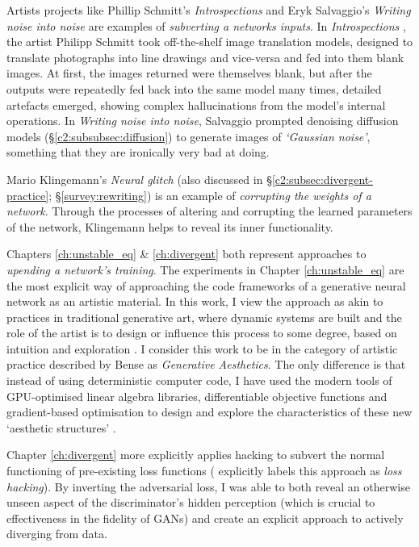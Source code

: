 Artists projects like Phillip Schmitt's \textit{Introspections} \citep{schmitt2019introspections} and Eryk Salvaggio's \textit{Writing noise into noise} \citep{salvaggio2023noise} are examples of \textit{subverting a networks inputs}. 
In \textit{Introspections} \cite{schmitt2019introspections}, the artist Philipp Schmitt took off-the-shelf image translation models, designed to translate photographs into line drawings and vice-versa and fed into them blank images. At first, the images returned were themselves blank, but after the outputs were repeatedly fed back into the same model many times, detailed artefacts emerged, showing complex hallucinations from the model's internal operations.
In \textit{Writing noise into noise}, Salvaggio prompted denoising diffusion models (\S \ref{c2:subsubsec:diffusion}) to generate images of \textit{`Gaussian noise'}, something that they are ironically very bad at doing.

Mario Klingemann's \textit{Neural glitch} (also discussed in \S \ref{c2:subsec:divergent-practice}; \S \ref{survey:rewriting}) is an example of \textit{corrupting the weights of a network}. 
Through the processes of altering and corrupting the learned parameters of the network, Klingemann helps to reveal its inner functionality.

Chapters \ref{ch:unstable_eq} \& \ref{ch:divergent} both represent approaches to \textit{upending a network's training}. 
The experiments in Chapter \ref{ch:unstable_eq} are the most explicit way of approaching the code frameworks of a generative neural network as an artistic material.
In this work, I view the approach as akin to practices in traditional generative art, where dynamic systems are built and the role of the artist is to design or influence this process to some degree, based on intuition and exploration \cite{mccormack2004generative}.
I consider this work to be in the category of artistic practice described by Bense as \textit{Generative Aesthetics}.
The only difference is that instead of using deterministic computer code, I have used the modern tools of GPU-optimised linear algebra libraries, differentiable objective functions and gradient-based optimisation to design and explore the characteristics of these new `aesthetic structures' \citep{bense1965projekte}.

Chapter \ref{ch:divergent} more explicitly applies  hacking to subvert the normal functioning of pre-existing loss functions (\cite{berns2020bridging} explicitly labels this approach as \textit{loss hacking}).
By inverting the adversarial loss, I was able to both reveal an otherwise unseen aspect of the discriminator's hidden perception (which is crucial to effectiveness in the fidelity of GANs) and create an explicit approach to actively diverging from data.


